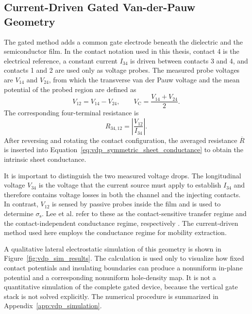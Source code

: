 \subsection{Current-Driven Gated Van-der-Pauw Geometry}
\label{subsec:current_driven_gvdp}

The gated method adds a common gate electrode beneath the dielectric and the
semiconductor film. In the contact notation used in this thesis, contact 4 is
the electrical reference, a constant current $I_{34}$ is driven between
contacts 3 and 4, and contacts 1 and 2 are used only as voltage probes. The
measured probe voltages are $V_{14}$ and $V_{24}$, from which the transverse van
der Pauw voltage and the mean potential of the probed region are defined as
\begin{equation}
    V_{12}=V_{14}-V_{24},
    \qquad
    V_\mathrm{C}=\frac{V_{14}+V_{24}}{2}.
    \label{eq:gvdp_probe_voltage_and_vc}
\end{equation}
The corresponding four-terminal resistance is
\begin{equation}
    R_{34,12}=\left|\frac{V_{12}}{I_{34}}\right|.
    \label{eq:gvdp_measured_resistance}
\end{equation}
After reversing and rotating the contact configuration, the averaged resistance
$\overline{R}$ is inserted into
Equation~\eqref{eq:vdp_symmetric_sheet_conductance} to obtain the intrinsic
sheet conductance.

It is important to distinguish the two measured voltage drops. The longitudinal
voltage $V_{34}$ is the voltage that the current source must apply to establish
$I_{34}$ and therefore contains voltage losses in both the channel and the
injecting contacts. In contrast, $V_{12}$ is sensed by passive probes inside the
film and is used to determine $\sigma_\mathrm{s}$. Lee et al. refer to these as
the contact-sensitive transfer regime and the contact-independent conductance
regime, respectively \cite{Lee2025VoltageDrivenGVDP}. The current-driven method
used here employs the conductance regime for mobility extraction.

A qualitative lateral electrostatic simulation of this geometry is shown in
Figure~\ref{fig:vdp_sim_results}. The calculation is used only to visualize how
fixed contact potentials and insulating boundaries can produce a nonuniform
in-plane potential and a corresponding nonuniform hole-density map. It is not a
quantitative simulation of the complete gated device, because the vertical gate
stack is not solved explicitly. The numerical procedure is summarized in
Appendix~\ref{app:vdp_simulation}.


